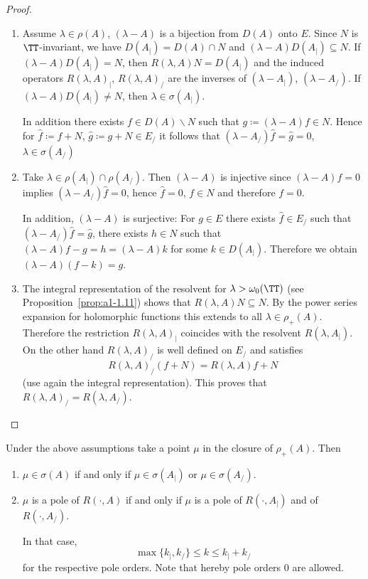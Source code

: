 \begin{proof}
\begin{enumerate}[\upshape (i), wide, labelindent=.25em]
\item 
Assume $\lambda \in \rho(A)$, \ie $(\lambda-A)$ is a bijection from $D(A)$ onto $E$.
Since $N$ is $\TT$-invariant, we have $D(A_{|}) = D(A) \cap N$ and $(\lambda-A)D(A_{|}) \subseteq N$.
If\/ $(\lambda-A)D(A_{|}) = N$, then $R(\lambda,A)N = D(A_{|})$ and the induced operators $R(\lambda,A)_{|}$, \resp $R(\lambda,A)_{/}$ are the inverses of\/ $(\lambda-A_{|})$, \resp $(\lambda-A_{/})$.
If\/ $(\lambda-A)D(A_{|}) \neq N$, then $\lambda \in \sigma(A_{|})$.

In addition there exists $f \in D(A)\backslash N$ such that $g \coloneq (\lambda-A)f \in N$.
Hence for $\hat{f} \coloneq f+N$, $\hat{g} \coloneq g+N \in E_{/}$ it follows that $(\lambda-A_{/})\hat{f} = \hat{g} = 0$, \ie $\lambda \in \sigma(A_{/})$

\item 
Take $\lambda \in \rho(A_{|}) \cap \rho(A_{/})$.
Then $(\lambda-A)$ is injective since $(\lambda-A)f = 0$ implies $(\lambda-A_{/})\hat{f}= 0$, hence $\hat{f} = 0$, \ie $f \in N$ and therefore $f = 0$.

In addition, $(\lambda-A)$ is surjective: For $g \in E$ there exists $\hat{f} \in E_{/}$ such that $(\lambda-A_{/})\hat{f} = \hat{g}$, \ie there exists $h \in N$ such that $(\lambda-A)f - g = h = (\lambda-A)k$ for some $k \in D(A_{|})$.
Therefore we obtain $(\lambda-A)(f-k) = g$. 

\item 
The integral representation of the resolvent for $\lambda > \omega_{0}(\TT)$ (see Proposition~\ref{prop:a1-1.11}) shows that $R(\lambda,A)N \subseteq N$.
By the power series expansion for holomorphic functions this extends to all $\lambda \in \rho_{+}(A)$.
Therefore the restriction $R(\lambda,A)_{|}$ coincides with the resolvent $R(\lambda,A_{|})$.
On the other hand $R(\lambda,A)_{/}$ is well defined on $E_{/}$ and satisfies
\[
R(\lambda,A)_{/}(f+N) = R(\lambda,A)f + N
\]
(use again the integral representation).
This proves that $R(\lambda,A)_{/} = R(\lambda,A_{/})$.
\qedhere
\end{enumerate}
\end{proof}
\begin{corollary}\label{cor:a3-4.3}
Under the above assumptions take a point $\mu$ in the closure of\/ $\rho_{+}(A)$.
Then
\begin{enumerate}[\upshape (i)]
\item 
$\mu \in \sigma(A)$ if and only if\/ $\mu \in \sigma(A_{|})$ or $\mu \in \sigma(A_{/})$. 

\item 
$\mu$ is a pole of\/ $R(\cdot,A)$ if and only if\/ $\mu$ is a pole of\/ $R(\cdot,A_{|})$ and of\/ $R(\cdot,A_{/})$. 

In that case,
\[
\max\{k_{|},k_{/}\} \leq k \leq k_{|} + k_{/}
\]
for the respective pole orders. Note that hereby pole orders $0$ are allowed.
\end{enumerate}
\end{corollary}
